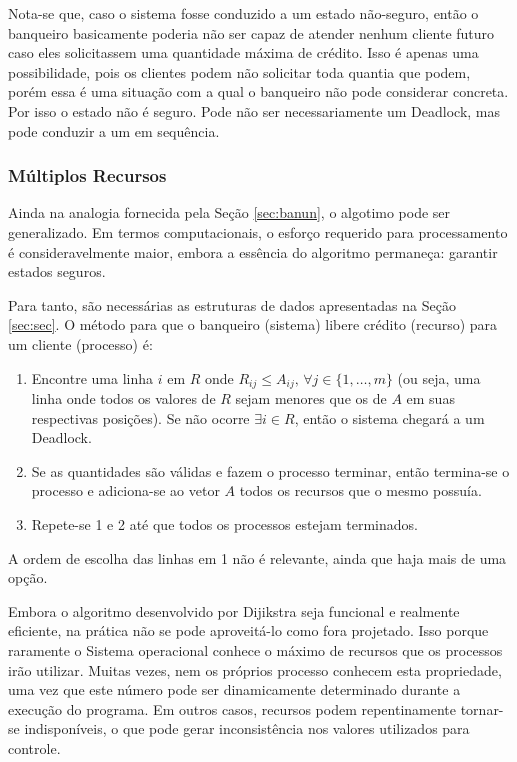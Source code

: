 	Nota-se que, caso o sistema fosse conduzido a um estado não-seguro, então o banqueiro basicamente poderia não ser capaz de atender nenhum cliente futuro caso eles solicitassem uma quantidade máxima de crédito. Isso é apenas uma possibilidade, pois os clientes podem não solicitar toda quantia que podem, porém essa é uma situação com a qual o banqueiro não pode considerar concreta. Por isso o estado não é seguro. Pode não ser necessariamente um Deadlock, mas pode conduzir a um em sequência.

	\subsubsection{Múltiplos Recursos}
	Ainda na analogia fornecida pela Seção \ref{sec:banun}, o algotimo pode ser generalizado. Em termos computacionais, o esforço requerido para processamento é consideravelmente maior, embora a essência do algoritmo permaneça: garantir estados seguros.

	Para tanto, são necessárias as estruturas de dados apresentadas na Seção \ref{sec:sec}. O método para que o banqueiro (sistema) libere crédito (recurso) para um cliente (processo) é:
	\begin{enumerate}
		\item Encontre uma linha $i$ em $R$ onde $R_{ij} \leq A_{ij},\, \forall j \in \{1,\dots,m\}$ (ou seja, uma linha onde todos os valores de $R$ sejam menores que os de $A$ em suas respectivas posições). Se não ocorre $\exists i \in R$, então o sistema chegará a um Deadlock.
		\item Se as quantidades são válidas e fazem o processo terminar, então termina-se o processo e adiciona-se ao vetor $A$ todos os recursos que o mesmo possuía.
		\item Repete-se 1 e 2 até que todos os processos estejam terminados.
	\end{enumerate}
	A ordem de escolha das linhas em 1 não é relevante, ainda que haja mais de uma opção.

	Embora o algoritmo desenvolvido por Dijikstra seja funcional e realmente eficiente, na prática não se pode aproveitá-lo como fora projetado. Isso porque raramente o Sistema operacional conhece o máximo de recursos que os processos irão utilizar. Muitas vezes, nem os próprios processo conhecem esta propriedade, uma vez que este número pode ser dinamicamente determinado durante a execução do programa. Em outros casos, recursos podem repentinamente tornar-se indisponíveis, o que pode gerar inconsistência nos valores utilizados para controle.

